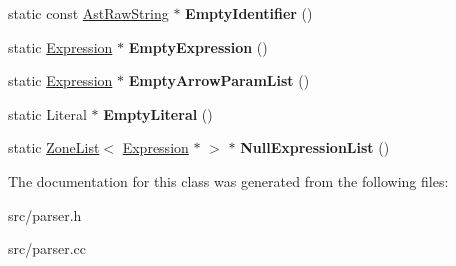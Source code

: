 \begin{DoxyCompactItemize}
\item 
\hypertarget{classv8_1_1internal_1_1_parser_traits_a7851f72644ad747ea11af4739f96d234}{}static const \hyperlink{classv8_1_1internal_1_1_ast_raw_string}{Ast\+Raw\+String} $\ast$ {\bfseries Empty\+Identifier} ()\label{classv8_1_1internal_1_1_parser_traits_a7851f72644ad747ea11af4739f96d234}

\item 
\hypertarget{classv8_1_1internal_1_1_parser_traits_a835157f245dd4e0aca90c1894ccf99f3}{}static \hyperlink{classv8_1_1internal_1_1_expression}{Expression} $\ast$ {\bfseries Empty\+Expression} ()\label{classv8_1_1internal_1_1_parser_traits_a835157f245dd4e0aca90c1894ccf99f3}

\item 
\hypertarget{classv8_1_1internal_1_1_parser_traits_a1b657bdce48627e2b9830683d38cb086}{}static \hyperlink{classv8_1_1internal_1_1_expression}{Expression} $\ast$ {\bfseries Empty\+Arrow\+Param\+List} ()\label{classv8_1_1internal_1_1_parser_traits_a1b657bdce48627e2b9830683d38cb086}

\item 
\hypertarget{classv8_1_1internal_1_1_parser_traits_af0ab96a38f016048f2df34626915f55f}{}static Literal $\ast$ {\bfseries Empty\+Literal} ()\label{classv8_1_1internal_1_1_parser_traits_af0ab96a38f016048f2df34626915f55f}

\item 
\hypertarget{classv8_1_1internal_1_1_parser_traits_a0f22a0d39815506203df7680e198ae9c}{}static \hyperlink{classv8_1_1internal_1_1_zone_list}{Zone\+List}$<$ \hyperlink{classv8_1_1internal_1_1_expression}{Expression} $\ast$ $>$ $\ast$ {\bfseries Null\+Expression\+List} ()\label{classv8_1_1internal_1_1_parser_traits_a0f22a0d39815506203df7680e198ae9c}

\end{DoxyCompactItemize}


The documentation for this class was generated from the following files\+:\begin{DoxyCompactItemize}
\item 
src/parser.\+h\item 
src/parser.\+cc\end{DoxyCompactItemize}

